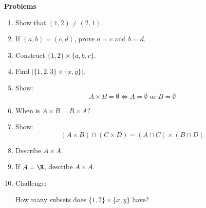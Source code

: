 \documentclass[11pt]{article}
\begin{document}
\begin{problembox}

\textbf{Problems}

\begin{enumerate}

\item Show that $(1,2) \neq (2,1)$.

\item If $(a,b) = (c,d)$, prove $a=c$ and $b=d$.

\item Construct $\{1,2\} \times \{a,b,c\}$.

\item Find $|\{1,2,3\} \times \{x,y\}|$.

\item Show:
\[
A \times B = \emptyset \iff A = \emptyset \text{ or } B = \emptyset
\]

\item When is $A \times B = B \times A$?

\item Show:
\[
(A \times B) \cap (C \times D) = (A \cap C) \times (B \cap D)
\]

\item Describe $A \times A$.

\item If $A = \R$, describe $A \times A$.

\item Challenge:

How many subsets does $\{1,2\} \times \{x,y\}$ have?

\end{enumerate}

\end{problembox}
\end{document}
